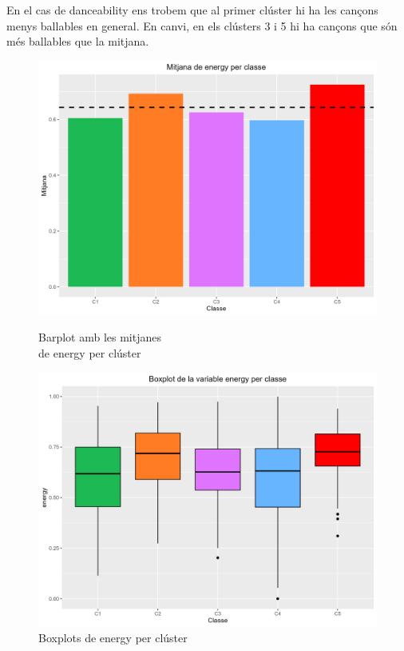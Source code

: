 En el cas de danceability ens trobem que al primer clúster hi ha les cançons menys ballables en general. En canvi, en els clústers 3 i 5 hi ha cançons que són més ballables que la mitjana. 

\begin{figure}[H]
\centering
    \begin{minipage}{.49\textwidth}
        \centering
        \includegraphics[width=0.95\linewidth]{Images/5_Profiling/numeriques/Num_BarPlot_energy.png}
        \caption{Barplot amb les mitjanes \\ de energy per clúster}
        \label{fig:Num_BarPlot_streams}
    \end{minipage}%
    \begin{minipage}{.49\textwidth}
        \centering
        \includegraphics[width=0.95\linewidth]{Images/5_Profiling/numeriques/Num_BoxPlot_energy.png}
        \caption{Boxplots de energy per clúster}
        \label{fig:Num_BoxPlot_streams}
    \end{minipage}%
\end{figure}
